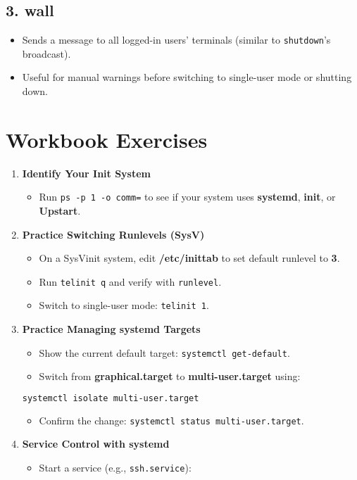 \documentclass[a4paper]{report}
\begin{document}
\subsection*{3. wall}
\begin{itemize}
    \item Sends a message to all logged-in users’ terminals (similar to \texttt{shutdown}’s broadcast).
    \item Useful for manual warnings before switching to single-user mode or shutting down.
\end{itemize}

\section*{Workbook Exercises}

\begin{enumerate}
    \item \textbf{Identify Your Init System}
    \begin{itemize}
        \item Run \texttt{ps -p 1 -o comm=} to see if your system uses \textbf{systemd}, \textbf{init}, or \textbf{Upstart}.
    \end{itemize}
    \item \textbf{Practice Switching Runlevels (SysV)}
    \begin{itemize}
        \item On a SysVinit system, edit \textbf{/etc/inittab} to set default runlevel to \textbf{3}.
        \item Run \texttt{telinit q} and verify with \texttt{runlevel}.
        \item Switch to single-user mode: \texttt{telinit 1}.
    \end{itemize}
    \item \textbf{Practice Managing systemd Targets}
    \begin{itemize}
        \item Show the current default target: \texttt{systemctl get-default}.
        \item Switch from \textbf{graphical.target} to \textbf{multi-user.target} using:
\end{itemize}

\begin{lstlisting}[language=bash]
systemctl isolate multi-user.target
\end{lstlisting}

\begin{itemize}
        \item Confirm the change: \texttt{systemctl status multi-user.target}.
    \end{itemize}
    \item \textbf{Service Control with systemd}
    \begin{itemize}
        \item Start a service (e.g., \texttt{ssh.service}):
\end{itemize}


\end{enumerate}
\end{document}
